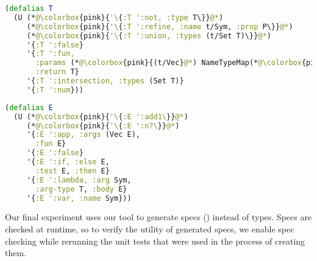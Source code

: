 \begin{minipage}[t]{0.54\linewidth}
\begin{lstlisting}[language=Clojure]
(defalias T
  (U (*@\colorbox{pink}{'\{:T ':not, :type T\}}@*)
     (*@\colorbox{pink}{'\{:T ':refine, :name t/Sym, :prop P\}}@*)
     (*@\colorbox{pink}{'\{:T ':union, :types (t/Set T)\}}@*)
     '{:T ':false}
     '{:T ':fun,
       :params (*@\colorbox{pink}{(t/Vec}@*) NameTypeMap(*@\colorbox{pink}{)}@*),
       :return T}
     '{:T ':intersection, :types (Set T)}
     '{:T ':num}))
\end{lstlisting}
\end{minipage}
%
\begin{minipage}[t]{0.4\linewidth}
\begin{lstlisting}[language=Clojure]
(defalias E
  (U (*@\colorbox{pink}{'\{:E ':add1\}}@*)
     (*@\colorbox{pink}{'\{:E ':n?\}}@*)
     '{:E ':app, :args (Vec E),
       :fun E}
     '{:E ':false}
     '{:E ':if, :else E,
       :test E, :then E}
     '{:E ':lambda, :arg Sym,
       :arg-type T, :body E}
     '{:E ':var, :name Sym}))
\end{lstlisting}
\end{minipage}






\label{infer:sec:experiment3}

Our final experiment uses our tool to
generate specs ()
instead of types.
Specs are checked at runtime,
so to verify the utility of generated specs,
we enable spec checking while
rerunning the unit tests that were used
in the process of creating them.

